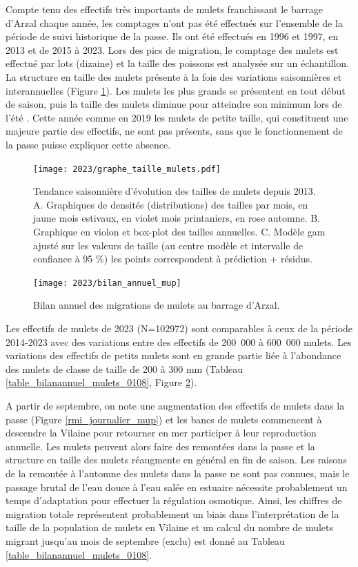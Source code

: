 \documentclass[11pt,twocolumn,titlepage,twoside]{article}\usepackage[]{graphicx}\usepackage[]{color}
\begin{document}
Compte tenu des effectifs très importants de mulets franchissant le barrage
d'Arzal chaque année, les comptages n'ont pas été effectués sur l'ensemble de la
période de suivi historique de la passe. Ils ont été effectués en 1996 et
1997, en 2013 et de 2015 à 2023. Lors des pics de migration, le comptage des
mulets est effectué par lots (dizaine) et la taille des poissons est analysée
sur un échantillon.
La structure en
taille des mulets présente à la fois des variations saisonnières et
interannuelles (Figure \ref{figure_taille_mulets}). Les mulets les plus grands
se présentent en tout début de saison, puis la taille des mulets diminue pour
atteindre son minimum lors de l'été \citep{lemonnier_dynamique_2019}.
Cette année comme en 2019 les mulets de petite taille, qui constituent une
majeure partie des effectifs, ne sont pas présents, sans que le fonctionnement
de la passe puisse expliquer cette absence.

\begin{figure}[htpb]
\centering
\texttt{[image: 2023/graphe\_taille\_mulets.pdf]} 
\caption{Tendance saisonnière d'évolution des
tailles de mulets depuis 2013. A. Graphiques de densités (distributions) des
tailles par mois, en jaune mois estivaux, en violet mois printaniers, en rose
automne. B. Graphique en violon et box-plot des tailles annuelles. C. Modèle gam
ajusté sur les valeurs de taille (au centre modèle et intervalle de confiance
 à 95 \%) les points correspondent à prédiction + résidus.}
\label{figure_taille_mulets}
\end{figure}



\begin{figure}[htpb]
\centering
\texttt{[image: 2023/bilan\_annuel\_mup]} 
\caption{Bilan annuel des migrations de mulets au barrage d'Arzal.}
\label{bilan_annuel_mup}
\end{figure}

Les effectifs de mulets de 2023
(N=102972) 
sont comparables à ceux de la période 2014-2023 avec des variations entre des effectifs de 200~000 à 600~000 mulets.
Les variations des effectifs de petits mulets sont en 
grande partie liée à l'abondance des mulets de classe de taille de 200 à 300 mm
\citep{lemonnier_dynamique_2019} (Tableau \ref{table_bilanannuel_mulets_0108}, Figure
\ref{bilan_annuel_mup}).

A partir de septembre, on note une augmentation des effectifs de mulets dans la
passe (Figure \ref{rmi_journalier_mup}) et les bancs de mulets commencent à
descendre la Vilaine pour retourner en mer participer à leur reproduction
annuelle. Les mulets peuvent alors faire des remontées dans la passe et la
structure en taille des mulets réaugmente en général en fin de saison. Les
raisons de la remontée à l'automne des mulets dans la passe ne sont pas connues,
mais le passage brutal de l'eau douce à l'eau salée en estuaire nécessite
probablement un temps d'adaptation pour effectuer la régulation osmotique.
Ainsi, les chiffres de migration totale représentent probablement un biais dans
l'interprétation de la taille de la population de mulets en Vilaine et un calcul
du nombre de mulets migrant jusqu'au mois de septembre (exclu) est donné au
Tableau \ref{table_bilanannuel_mulets_0108}.
\end{document}
